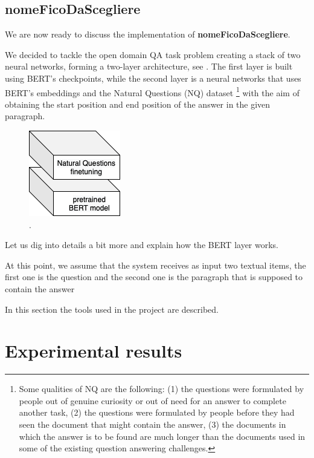 \documentclass[12pt,a4paper,hidelinks]{article}
\newcommand{\nomefico}{\textbf{nomeFicoDaScegliere}}
\begin{document}
\subsection{\nomefico}\label{subsec:nomefico}
We are now ready to discuss the implementation of \nomefico.

We decided to tackle the open domain QA task problem creating a stack of two neural networks, forming a two-layer architecture, see .
The first layer is built using BERT's \cite{devlin2018bert} checkpoints, while the second layer is a neural networks that uses BERT's embeddings and the Natural Questions (NQ) \cite{kwiatowski} dataset \footnote{Some qualities of NQ are the following: (1) the questions were formulated by people out of genuine curiosity or out of need for an answer to complete another task, (2) the questions were formulated by people before they had seen the document that might contain the answer, (3) the documents in which the answer is to be found are much longer than the documents used in some of the existing question answering challenges.} with the aim of obtaining the start position and end position of the answer in the given paragraph.

\begin{figure}[ht!]
    \centering
    \includegraphics[scale=.9]{pics/broad_architecture.png}
    \caption{.}
    \label{fig:broad_architecture}
\end{figure}



Let us dig into details a bit more and explain how the BERT layer works.



At this point, we assume that the system receives as input two textual items, the first one is the question and the second one is the paragraph that is supposed to contain the answer


In this section the tools used in the project are described.

\section{Experimental results}\label{sec:experimental_results}
\end{document}

